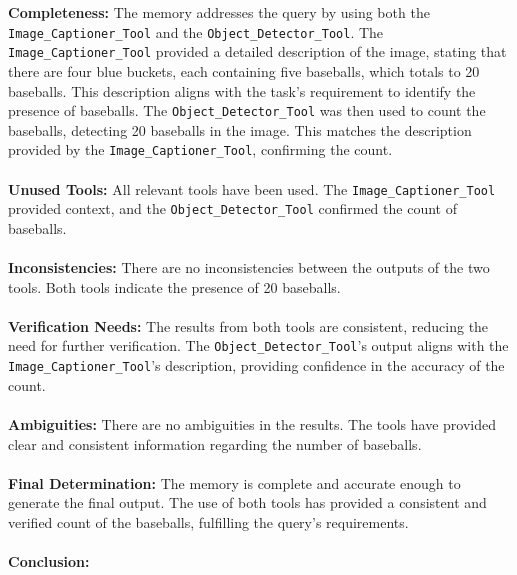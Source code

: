 \begin{plannerbox}

\textbf{Completeness:}
The memory addresses the query by using both the \texttt{Image\_Captioner\_Tool} and the \texttt{Object\_Detector\_Tool}. The \texttt{Image\_Captioner\_Tool} provided a detailed description of the image, stating that there are four blue buckets, each containing five baseballs, which totals to 20 baseballs. This description aligns with the task's requirement to identify the presence of baseballs.
The \texttt{Object\_Detector\_Tool} was then used to count the baseballs, detecting 20 baseballs in the image. This matches the description provided by the \texttt{Image\_Captioner\_Tool}, confirming the count.
\\\\
\textbf{Unused Tools:}
All relevant tools have been used. The \texttt{Image\_Captioner\_Tool} provided context, and the \texttt{Object\_Detector\_Tool} confirmed the count of baseballs.
\\\\
\textbf{Inconsistencies:}
There are no inconsistencies between the outputs of the two tools. Both tools indicate the presence of 20 baseballs.
\\\\
\textbf{Verification Needs:}
The results from both tools are consistent, reducing the need for further verification. The \texttt{Object\_Detector\_Tool}'s output aligns with the \texttt{Image\_Captioner\_Tool}'s description, providing confidence in the accuracy of the count.
\\\\
\textbf{Ambiguities:}
There are no ambiguities in the results. The tools have provided clear and consistent information regarding the number of baseballs.
\\\\
\textbf{Final Determination:}
The memory is complete and accurate enough to generate the final output. The use of both tools has provided a consistent and verified count of the baseballs, fulfilling the query's requirements.
\\\\
\textbf{Conclusion:} 
\end{plannerbox}

